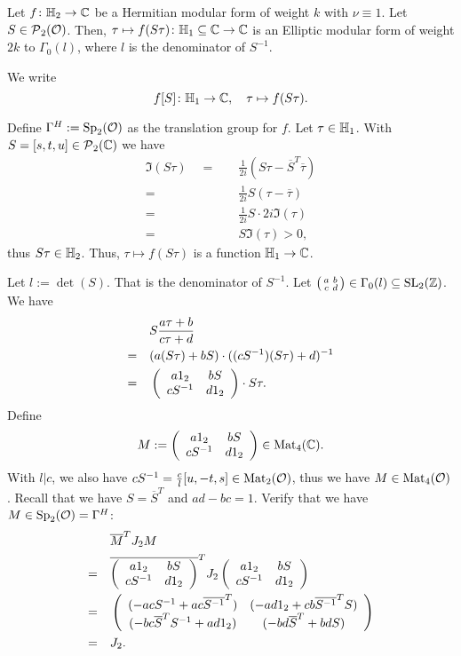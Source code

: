 \begin{lemma}
Let $f \colon \mathbb{H}_2 \rightarrow \mathbb{C}$ be a Hermitian modular form of weight $k$ with $\nu \equiv 1$. Let $S \in \operatorname{\mathcal{P}}_2(\mathcal{O})$.
Then, $\tau \mapsto f(S \tau) \colon \mathbb{H}_1 \subseteq \mathbb{C} \rightarrow \mathbb{C}$ is an Elliptic modular form of weight $2k$ to $\Gamma_0(l)$, where $l$ is the denominator of $S^{-1}$.  %

We write
\[  f[S] \colon \mathbb{H}_1 \rightarrow \mathbb{C}, \quad \tau \mapsto f(S \tau) . \]

\proof
Define $\Gamma^H := \operatorname{Sp}_2(\mathcal{O})$ as the translation group for $f$.
Let $\tau \in \mathbb{H}_1$. With $S = [s,t,u] \in \operatorname{\mathcal{P}}_2(\mathbb{C})$ we have
\begin{align*}
\Im(S\tau) \quad = \quad& \frac{1}{2i} \left( S \tau - \overline{S}^T \overline{\tau} \right) \\
= \quad & \frac{1}{2i} S (\tau - \overline{\tau}) \\
= \quad & \frac{1}{2i} S \cdot 2i \Im(\tau) \\
= \quad & S \Im(\tau) > 0 ,
\end{align*}
thus $S \tau \in \mathbb{H}_2$. Thus, $\tau \mapsto f(S \tau)$ is a function $\mathbb{H}_1 \rightarrow \mathbb{C}$.

Let $l := \det(S)$. That is the denominator of $S^{-1}$. Let $\left( \begin{smallmatrix} a & b \\ c & d \end{smallmatrix} \right) \in \Gamma_0(l) \subseteq \operatorname{SL}_2(\mathbb{Z})$. We have
\begin{align*}
& S \frac{a \tau + b}{c \tau + d} \\
=\quad & (a (S \tau) + bS) \cdot ((c S^{-1}) (S \tau) + d)^{-1} \\
=\quad & \left( \begin{array}{cc} a 1_2 & b S \\ c S^{-1} & d 1_2 \end{array} \right) \cdot S \tau .
\end{align*}
Define
\[ M := \left( \begin{array}{cc} a 1_2 & b S \\ c S^{-1} & d 1_2 \end{array} \right) \in \operatorname{Mat}_4(\mathbb{C}) . \]
With $l | c$, we also have $c S^{-1} = \frac{c}{l} [u, -t, s] \in \operatorname{Mat}_2(\mathcal{O})$, thus we have $M \in \operatorname{Mat}_4(\mathcal{O})$.
Recall that we have $S = \overline{S}^T$ and $ad  - bc = 1$. Verify that we have $M \in \operatorname{Sp}_2(\mathcal{O}) = \Gamma^H$:
\begin{align*}
&  \overline{M}^T J_2 M \\
=\quad & \overline{\left( \begin{array}{cc} a 1_2 & b S \\ c S^{-1} & d 1_2 \end{array} \right)}^T J_2 \left( \begin{array}{cc} a 1_2 & b S \\ c S^{-1} & d 1_2 \end{array} \right) \\
=\quad & \left( \begin{array}{cc} (-ac S^{-1} + ac \overline{S^{-1}}^T) & (-ad 1_2 + cb \overline{S^{-1}}^T S) \\ (-bc \overline{S}^T S^{-1} + ad 1_2) & (-bd \overline{S}^T + bd S) \end{array} \right) \\
=\quad & J_2 .
\end{align*}


\end{lemma}
